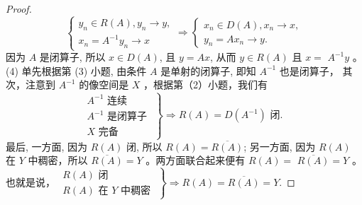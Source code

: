 \documentclass[lang=cn,newtx,10pt,scheme=chinese,thmcnt=chapter]{elegantbook}
\begin{document}
\begin{proof}
\begin{equation*}
\left\{\begin{array} { l } 
{ y _ { n } \in R ( A ) , y _ { n } \rightarrow y , } \\
{ x _ { n } = A ^ { - 1 } y _ { n } \rightarrow x }
\end{array} \Rightarrow \left\{\begin{array}{l}
x_n \in D(A), x_n \rightarrow x, \\
y_n=A x_n \rightarrow y .
\end{array}\right.\right.
\end{equation*}
因为 $A$ 是闭算子, 所以 $x \in D(A)$, 且 $y=A x$, 从而 $y \in R(A)$ 且 $x=$ $A^{-1} y$ 。\\
(4) 单先根据第 (3) 小题, 由条件 $A$ 是单射的闭算子, 即知 $A^{-1}$ 也是闭算子，
其次，注意到 $A^{-1}$ 的像空间是 $X$ ，根据第（2）小题，我们有
\begin{equation*}
\left.\begin{array}{l}
A^{-1} \text { 连续 } \\
A^{-1} \text { 是闭算子 } \\
X \text { 完备 }
\end{array}\right\} \Rightarrow R(A)=D\left(A^{-1}\right) \text { 闭. }
\end{equation*}
最后, 一方面, 因为 $R(A)$ 闭, 所以 $R(A)=\overline{R(A)}$; 另一方面, 因为 $R(A)$ 在 $Y$ 中稠密，所以 $\overline{R(A)}= Y$ 。两方面联合起来便有 $R(A)=$ $\overline{R(A)}= Y$ 。 也就是说，
$\left.\begin{array}{l}R(A) \text { 闭 } \\ R(A) \text { 在 } Y \text { 中稠密 }\end{array}\right\} \Rightarrow R(A)=\overline{R(A)}= Y$.
\end{proof}
\end{document}

